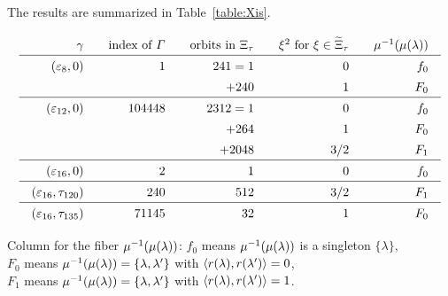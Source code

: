\documentclass{amsart} %
\begin{document}
%
The results are summarized in Table~\ref{table:Xis}.
%
%
\begin{table}
\[
\setlength{\arraycolsep}{10pt}
\renewcommand{\arraystretch}{1.4}
\begin{array}{rrrrr}
\gamma &\textrm{index of $\vGam$} &\textrm{orbits in $\Xitau$} & \xi^2 \textrm{ for } \xi\in \tilXitau&\mu\inv(\mu(\lambda))\\
\hline 
(\vep_8, 0) &1 & 241= 1 & 0 & f_0 \\
   & & +240 & 1 & F_0 \\
\hline 
(\vep_{12}, 0) &104448 & 2312= 1 & 0 & f_0 \\
   & & +264 & 1 & F_0 \\
   & & +2048 & 3/2 & F_1 \\
 \hline 
(\vep_{16}, 0) &2& 1 & 0 & f_0 \\
\hline 
(\vep_{16}, \tau_{120}) &240& 512 & 3/2 & F_1 \\
\hline 
(\vep_{16}, \tau_{135}) &71145 & 32 & 1 & F_0 \\   
\end{array}
\]
\vskip 3mm
%
\parbox{12cm}{
Column for the fiber $\mu^{-1}(\mu(\lambda))$: 
$f_0$ means $\mu^{-1}(\mu(\lambda))$ is a singleton $\{\lambda\}$,
\\
$ F_0$ means $\mu^{-1}(\mu(\lambda))=\{\lambda, \lambda^{\prime}\}$ with $\langle r(\lambda), r(\lambda^{\prime}) \rangle=0$, 
\\
$ F_1$ means $\mu^{-1}(\mu(\lambda))=\{\lambda, \lambda^{\prime}\}$ with $\langle r(\lambda), r(\lambda^{\prime}) \rangle=1$.
}
%

\vskip 5mm
\caption{Index $[\OG(\Lplus, \PPPplus): \vGam]$ and orbit decomposition of walls}\label{table:Xis}
\end{table}

\end{document}
